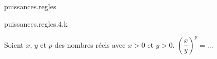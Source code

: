 \begin{qcm}{puissances.regles}
    \begin{question}{puissances.regles.4.k}
        {Soient \(x\), \(y\) et \(p\) des nombres réels avec \(x>0\) et \(y>0\). \(\left(\dfrac{x}{y}\right)^p=\ldots\)
         \begin{multicols}{2}
         \begin{reponses}
            \lastchoices
          \end{reponses}
         \end{multicols}}
    \end{question}
\end{qcm}

